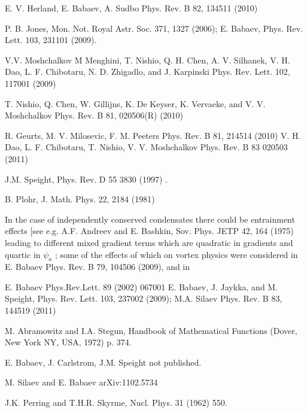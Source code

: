 \begin{thebibliography}{99}
 E. V. Herland, E. Babaev, A. Sudbo Phys. Rev. B 82, 134511 (2010)

 P. B. Jones, Mon. Not. Royal Astr. Soc. 371, 1327 (2006); E. Babaev, Phys. Rev. Lett. 103, 231101 (2009).

 V.V. Moshchalkov M Menghini, T. Nishio, Q. H. Chen, A. V. Silhanek, V. H. Dao, L. F. Chibotaru, N. D. Zhigadlo, and J. Karpinski Phys. Rev. Lett. 102, 117001 (2009)

 T. Nishio, Q. Chen, W. Gillijns, K. De Keyser, K. Vervaeke, and V. V. Moshchalkov Phys. Rev. B 81, 020506(R) (2010)

 R. Geurts, M. V. Milosevic, F. M. Peeters Phys. Rev. B 81, 214514 (2010) V. H. Dao, L. F. Chibotaru, T. Nishio, V. V. Moshchalkov Phys. Rev. B 83 020503 (2011)

 J.M. Speight, Phys. Rev. D 55 3830 (1997) .

 B. Plohr, J. Math. Phys. 22, 2184 (1981)

 In the case of independently conserved condensates there could be entrainment effects [see e.g. A.F. Andreev and E. Bashkin, Sov. Phys. JETP 42, 164 (1975) leading to different mixed gradient terms which are quadratic in gradients and quartic in \( \psi_a \) ; some of the effects of which on vortex physics were considered in E. Babaev Phys. Rev. B 79, 104506 (2009), and in\cite{bib:14}

 E. Babaev Phys.Rev.Lett. 89 (2002) 067001 E. Babaev, J. Jaykka, and M. Speight, Phys. Rev. Lett. 103, 237002 (2009); M.A. Silaev Phys. Rev. B 83, 144519 (2011)

 M. Abramowitz and I.A. Stegun, Handbook of Mathematical Functions (Dover, New York NY, USA, 1972) p. 374.

 E. Babaev, J. Carlstrom, J.M. Speight not published.

 M. Silaev and E. Babaev arXiv:1102.5734

 J.K. Perring and T.H.R. Skyrme, Nucl. Phys. 31 (1962) 550.

\end{thebibliography}
